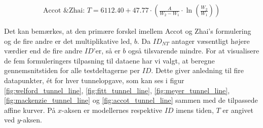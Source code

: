 \begin{align*}
\text{Accot \& Zhai: } T = 6112.40+47.77 \cdot \left(\frac{A}{W_2-W_1}\cdot\ln\left(\frac{W_2}{W_1 }\right)\right)
\end{align*}

Det kan bemærkes, at den primære forskel imellem Accot og Zhai's formulering og de fire andre er det multiplikative led, $b$. Da $ID_{NT}$ antager væsentligt højere værdier end de fire andre $ID$'er, så er $b$ også tilsvarende mindre. For at visualisere de fem formuleringers tilpasning til dataene har vi valgt, at beregne gennemsnitstiden for alle testdeltagerne per $ID$. Dette giver anledning til fire datapunkter, ét for hver tunnelopgave, som kan ses i figur \ref{fig:welford_tunnel_line}, \ref{fig:fitt_tunnel_line}, \ref{fig:meyer_tunnel_line},\ref{fig:mackenzie_tunnel_line} og \ref{fig:accot_tunnel_line} sammen med de tilpassede affine kurver. På $x$-aksen er modellernes respektive $ID$ imens tiden, $T$ er angivet ved $y$-aksen. 

